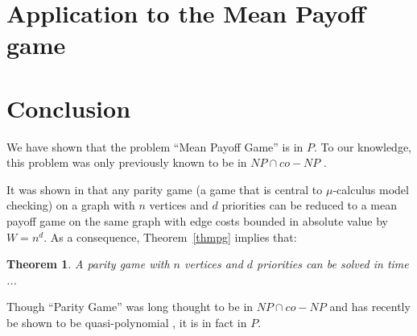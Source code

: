 \documentclass{article}
\newtheorem{theorem}{Theorem}
\begin{document}
\section{Application to the Mean Payoff game}
\label{mpg}

\section{Conclusion}

We have shown that the problem ``Mean Payoff Game'' is in $P$. To our knowledge, this problem was only previously known to be in $NP \cap co-NP$ \cite{zwick}.

It was shown in \cite{puri} that any parity game (a game that is central to $\mu$-calculus model checking) on a graph with $n$ vertices and $d$ priorities can be reduced to a mean payoff game on the same graph with edge costs bounded in absolute value by $W=n^d$. As a consequence, Theorem~\ref{thmpg} implies that:
\begin{theorem}
A parity game with $n$ vertices and $d$ priorities can be solved in time ...
\end{theorem}
Though ``Parity Game'' was long thought to be in $NP \cap co-NP$ and has recently be shown to be quasi-polynomial \cite{calude}, it is in fact in $P$.





 
\end{document}
